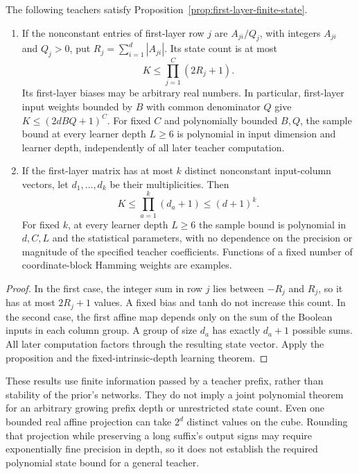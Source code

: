\begin{corollary}
\label{cor:discrete-statistic-bottleneck}
The following teachers satisfy Proposition~\ref{prop:first-layer-finite-state}.
\begin{enumerate}
\item If the nonconstant entries of first-layer row $j$ are
$A_{ji}/Q_j$, with integers $A_{ji}$ and $Q_j>0$, put
$R_j=\sum_{i=1}^d|A_{ji}|$. Its state count is at most
\[
 K\le\prod_{j=1}^C(2R_j+1).
\]
Its first-layer biases may be arbitrary real numbers. In particular,
first-layer input weights bounded by $B$ with common denominator $Q$
give $K\le(2dBQ+1)^C$. For fixed $C$ and polynomially bounded $B,Q$,
the sample bound at every learner depth $L\ge6$ is polynomial in input
dimension and learner depth, independently of all later teacher computation.
\item If the first-layer matrix has at most $k$ distinct nonconstant
input-column vectors, let $d_1,\ldots,d_k$ be their multiplicities.
Then
\[
 K\le\prod_{a=1}^k(d_a+1)\le(d+1)^k.
\]
For fixed $k$, at every learner depth $L\ge6$ the sample bound is
polynomial in $d,C,L$ and the statistical parameters, with no dependence on the precision or
magnitude of the specified teacher coefficients. Functions of a fixed
number of coordinate-block Hamming weights are examples.
\end{enumerate}
\end{corollary}

\begin{proof}
In the first case, the integer sum in row $j$ lies between $-R_j$
and $R_j$, so it has at most $2R_j+1$ values. A fixed bias and tanh
do not increase this count. In the second case, the first affine map
depends only on the sum of the Boolean inputs in each column group.
A group of size $d_a$ has exactly $d_a+1$ possible sums. All later
computation factors through the resulting state vector. Apply the
proposition and the fixed-intrinsic-depth learning theorem.
\end{proof}

These results use finite information passed by a teacher prefix,
rather than stability of the prior's networks. They do not imply a
joint polynomial theorem for an arbitrary growing prefix depth or
unrestricted state count. Even one bounded real affine projection can
take $2^d$ distinct values on the cube. Rounding that projection while
preserving a long suffix's output signs may require exponentially fine
precision in depth, so it does not establish the required polynomial
state bound for a general teacher.
